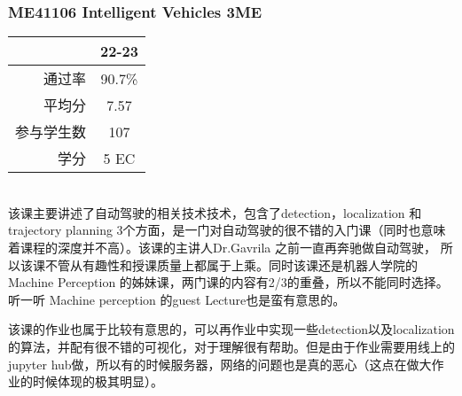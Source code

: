 \subsubsection{ME41106 Intelligent Vehicles 3ME}
\begin{minipage}{0.45\textwidth}
\centering
{}
\end{minipage}%
\begin{minipage}{0.45\textwidth}
\raggedleft
\begin{tabular}{r|c}
\textbf{ } & \textbf{22-23} \\ \hline
通过率 & 90.7\% \\ 
平均分 & 7.57 \\ 
参与学生数 & 107 \\ 
学分 & 5 EC\\
\end{tabular}
\end{minipage}\\

该课主要讲述了自动驾驶的相关技术技术，包含了detection，localization 和 trajectory planning 3个方面，是一门对自动驾驶的很不错的入门课（同时也意味着课程的深度并不高）。该课的主讲人Dr.Gavrila 之前一直再奔驰做自动驾驶， 所以该课不管从有趣性和授课质量上都属于上乘。同时该课还是机器人学院的Machine Perception 的姊妹课，两门课的内容有2/3的重叠，所以不能同时选择。听一听 Machine perception 的guest Lecture也是蛮有意思的。

该课的作业也属于比较有意思的，可以再作业中实现一些detection以及localization的算法，并配有很不错的可视化，对于理解很有帮助。但是由于作业需要用线上的jupyter hub做，所以有的时候服务器，网络的问题也是真的恶心（这点在做大作业的时候体现的极其明显）。

